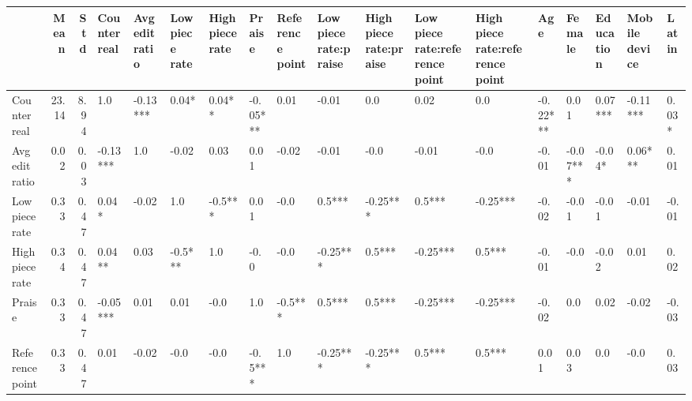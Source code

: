 \begin{tabular}{lrrlllllllllllllll}
\toprule
{} &  Mean &   Std & Counter real & Avg edit ratio & Low piece rate & High piece rate &    Praise & Reference point & Low piece rate:praise & High piece rate:praise & Low piece rate:reference point & High piece rate:reference point &       Age &    Female & Education & Mobile device &    Latin \\
\midrule
Counter real                    & 23.14 &  8.94 &          1.0 &       -0.13*** &          0.04* &          0.04** &  -0.05*** &            0.01 &                 -0.01 &                    0.0 &                           0.02 &                             0.0 &  -0.22*** &      0.01 &   0.07*** &      -0.11*** &    0.03* \\
Avg edit ratio                  &  0.02 &  0.03 &     -0.13*** &            1.0 &          -0.02 &            0.03 &      0.01 &           -0.02 &                 -0.01 &                   -0.0 &                          -0.01 &                            -0.0 &     -0.01 &  -0.07*** &    -0.04* &       0.06*** &     0.01 \\
Low piece rate                  &  0.33 &  0.47 &        0.04* &          -0.02 &            1.0 &         -0.5*** &      0.01 &            -0.0 &                0.5*** &               -0.25*** &                         0.5*** &                        -0.25*** &     -0.02 &     -0.01 &     -0.01 &         -0.01 &    -0.01 \\
High piece rate                 &  0.34 &  0.47 &       0.04** &           0.03 &        -0.5*** &             1.0 &      -0.0 &            -0.0 &              -0.25*** &                 0.5*** &                       -0.25*** &                          0.5*** &     -0.01 &      -0.0 &     -0.02 &          0.01 &     0.02 \\
Praise                          &  0.33 &  0.47 &     -0.05*** &           0.01 &           0.01 &            -0.0 &       1.0 &         -0.5*** &                0.5*** &                 0.5*** &                       -0.25*** &                        -0.25*** &     -0.02 &       0.0 &      0.02 &         -0.02 &    -0.03 \\
Reference point                 &  0.33 &  0.47 &         0.01 &          -0.02 &           -0.0 &            -0.0 &   -0.5*** &             1.0 &              -0.25*** &               -0.25*** &                         0.5*** &                          0.5*** &      0.01 &      0.03 &       0.0 &          -0.0 &     0.03 \\

\end{tabular}
